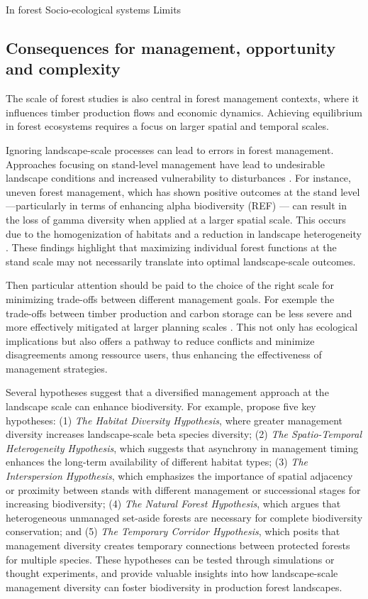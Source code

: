 \documentclass{article}
\begin{document}
In forest 
Socio-ecological systems
Limits \cite{artsForestsPolicyAnalysis2012}

\subsection{Consequences for management, opportunity and complexity}

The scale of forest studies is also central in forest management contexts, where it influences timber production flows and economic dynamics. Achieving equilibrium in forest ecosystems requires a focus on larger spatial and temporal scales.

Ignoring landscape-scale processes can lead to errors in forest management. Approaches focusing on stand-level management have lead to undesirable landscape conditions and increased vulnerability to disturbances \cite{Hunter1990,Cissel1994,Bergeron1999}. For instance, uneven forest management, which has shown positive outcomes at the stand level—particularly in terms of enhancing alpha biodiversity (REF) — can result in the loss of gamma diversity when applied at a larger spatial scale. This occurs due to the homogenization of habitats and a reduction in landscape heterogeneity \cite{heinrichsLandscapeScaleMixturesTree2019}. These findings highlight that maximizing individual forest functions at the stand scale may not necessarily translate into optimal landscape-scale outcomes.

Then particular attention should be paid to the choice of the right scale for minimizing trade-offs between different management goals. For exemple the trade-offs between timber production and carbon storage can be less severe and more effectively mitigated at larger planning scales \cite{pohjanmiesMoreMoreForest2017}. This not only has ecological implications but also offers a pathway to reduce conflicts and minimize disagreements among ressource users, thus enhancing the effectiveness of management strategies.

Several hypotheses suggest that a diversified management approach at the landscape scale can enhance biodiversity. For example, \cite{duflotManagementDiversityBegets2022} propose five key hypotheses: (1) \textit{The Habitat Diversity Hypothesis}, where greater management diversity increases landscape-scale beta species diversity; (2) \textit{The Spatio-Temporal Heterogeneity Hypothesis}, which suggests that asynchrony in management timing enhances the long-term availability of different habitat types; (3) \textit{The Interspersion Hypothesis}, which emphasizes the importance of spatial adjacency or proximity between stands with different management or successional stages for increasing biodiversity; (4) \textit{The Natural Forest Hypothesis}, which argues that heterogeneous unmanaged set-aside forests are necessary for complete biodiversity conservation; and (5) \textit{The Temporary Corridor Hypothesis}, which posits that management diversity creates temporary connections between protected forests for multiple species. These hypotheses can be tested through simulations or thought experiments, and provide valuable insights into how landscape-scale management diversity can foster biodiversity in production forest landscapes.
\end{document}
